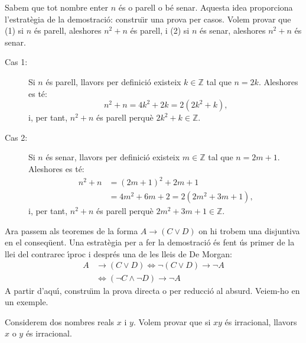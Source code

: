 \begin{solucio}
Sabem que tot nombre enter $n$ \'{e}s o parell o b\'{e} senar. Aquesta idea
proporciona l'estrat\`{e}gia de la demostraci\'{o}: constru\"{\i}r una prova
per casos. Volem provar que (1) si $n$ \'{e}s parell, aleshores $n^{2}+n$
\'{e}s parell, i (2) si $n$ \'{e}s senar, aleshores $n^{2}+n$ \'{e}s senar.

\begin{description}
\item[Cas 1:] Si $n$ \'{e}s parell, llavors per definici\'{o} existeix $k\in%
\mathbb{Z}$ tal que $n=2k$. Aleshores es t\'{e}:
\begin{equation*}
n^{2}+n=4k^{2}+2k=2\left( 2k^{2}+k\right) \text{,}
\end{equation*}
i, per tant, $n^{2}+n$ \'{e}s parell perqu\`{e} $2k^{2}+k\in\mathbb{Z}$.

\item[Cas 2:] Si $n$ \'{e}s senar, llavors per definici\'{o} existeix $m\in%
\mathbb{Z}$ tal que $n=2m+1$. Aleshores es t\'{e}:%
\begin{align*}
n^{2}+n & =\left( 2m+1\right) ^{2}+2m+1 \\
& =4m^{2}+6m+2=2\left( 2m^{2}+3m+1\right) \text{,}
\end{align*}
i, per tant, $n^{2}+n$ \'{e}s parell perqu\`{e} $2m^{2}+3m+1\in\mathbb{Z}$.
\end{description}
\end{solucio}

\bigskip

Ara passem als teoremes de la forma $A\longrightarrow\left( C\vee D\right) $
on hi trobem una disjuntiva en el conseq\"{u}ent. Una estrat\`{e}gia per a
fer la demostraci\'{o} \'{e}s fent \'{u}s primer de la llei del contrarec%
\'{\i}proc i despr\'{e}s una de les lleis de De Morgan:
\begin{align*}
A & \longrightarrow\left( C\vee D\right) \Longleftrightarrow\lnot\left(
C\vee D\right) \longrightarrow\lnot A \\
& \Longleftrightarrow\left( \lnot C\wedge\lnot D\right) \longrightarrow
\lnot A
\end{align*}
A partir d'aqu\'{\i}, constru\"{\i}m la prova directa o per reducci\'{o} al
absurd. Veiem-ho en un exemple.

\begin{exemple}
Considerem dos nombres reals $x$ i $y$. Volem provar que si $xy$ \'{e}s
irracional, llavors $x$ o $y$ \'{e}s irracional.
\end{exemple}

